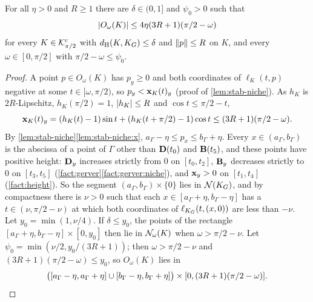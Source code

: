 \begin{lemma}\label{lem:stab-wedges}
For all $\eta>0$ and $R\ge1$ there are $\delta\in(0,1]$ and $\psi_0>0$ such
that
\[
  \lvert O_\omega(K)\rvert\le4\eta(3R+1)(\pi/2-\omega)
\]
for every $K\in\mathcal{K}^{\mathrm{c}}_{\pi/2}$ with $d_{\mathrm{H}}(K,K_G)\le\delta$ and $\lVert p\rVert\le R$ on
$K$, and every $\omega\in[0,\pi/2]$ with $\pi/2-\omega\le\psi_0$.
\end{lemma}

\begin{proof}
A point $p\in O_\omega(K)$ has $p_y\ge0$ and both coordinates of
$\ell_K(t,p)$ negative at some $t\in[\omega,\pi/2)$, so $p_y<\mathbf{x}_K(t)_y$
(proof of \cref{lem:stab-niche}). As $h_K$ is $2R$-Lipschitz, $h_K(\pi/2)=1$,
$\lvert h_K\rvert\le R$ and $\cos t\le\pi/2-t$,
\[
  \mathbf{x}_K(t)_y=(h_K(t)-1)\sin t+(h_K(t+\pi/2)-1)\cos t\le(3R+1)(\pi/2-\omega).
\]
By \cref{lem:stab-niche}\ref{lem:stab-niche:x},
$a_\Gamma-\eta\le p_x\le b_\Gamma+\eta$. Every $x\in(a_\Gamma,b_\Gamma)$ is the
abscissa of a point of $\Gamma$ other than $\mathbf{D}(t_0)$ and $\mathbf{B}(t_5)$, and these
points have positive height: $\mathbf{D}_y$ increases strictly from $0$ on
$[t_0,t_2]$, $\mathbf{B}_y$ decreases strictly to $0$ on $[t_3,t_5]$
(\cref{fact:gerver}\ref{fact:gerver:niche}), and $\mathbf{x}_y>0$ on $[t_1,t_4]$
(\cref{fact:height}). So the segment $(a_\Gamma,b_\Gamma)\times\{0\}$ lies in
$\mathcal{N}(K_G)$, and by compactness there is $\nu>0$ such that each
$x\in[a_\Gamma+\eta,b_\Gamma-\eta]$ has a $t\in(\nu,\pi/2-\nu)$ at which both
coordinates of $\ell_{K_G}(t,(x,0))$ are less than $-\nu$. Let
$y_0=\min(1,\nu/4)$. If $\delta\le y_0$, the points of the rectangle
$[a_\Gamma+\eta,b_\Gamma-\eta]\times[0,y_0]$ then lie in $\mathcal{N}_\omega(K)$ when
$\omega>\pi/2-\nu$. Let $\psi_0=\min(\nu/2,y_0/(3R+1))$; then $\omega>\pi/2-\nu$
and $(3R+1)(\pi/2-\omega)\le y_0$, so $O_\omega(K)$ lies in
\[
  \bigl([a_\Gamma-\eta,a_\Gamma+\eta]\cup[b_\Gamma-\eta,b_\Gamma+\eta]\bigr)
  \times[0,(3R+1)(\pi/2-\omega)].\qedhere
\]
\end{proof}

